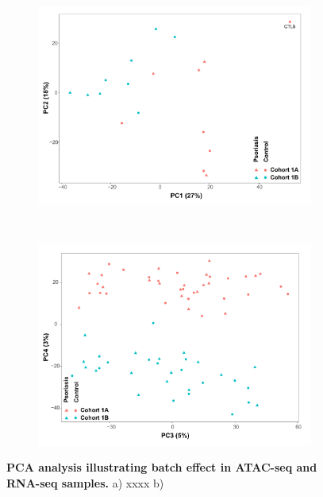 \bigskip
\begin{figure}[htbp]
\centering
\begin{subfigure}[b]{0.50\textwidth}
\centering 
\includegraphics[width=\textwidth]{./Appendix/pdfs/Chapter4/ATAC_CD8_PS_CTL_PCA}
\caption{}
\end{subfigure}
~
\begin{subfigure}[b]{0.50\textwidth} 
\centering
\includegraphics[width=\textwidth]{./Appendix/pdfs/Chapter4/PS_CTL_all_samples_varied_PCA3and4_plot}
\caption{}
\end{subfigure}
\caption[PCA analysis illustrating batch effect in ATAC-seq and RNA-seq samples.]{\textbf{PCA analysis illustrating batch effect in ATAC-seq and RNA-seq samples.} a) xxxx  b)}
\label{figure:ATAC_RNAseq_batch_effect}
\end{figure}



